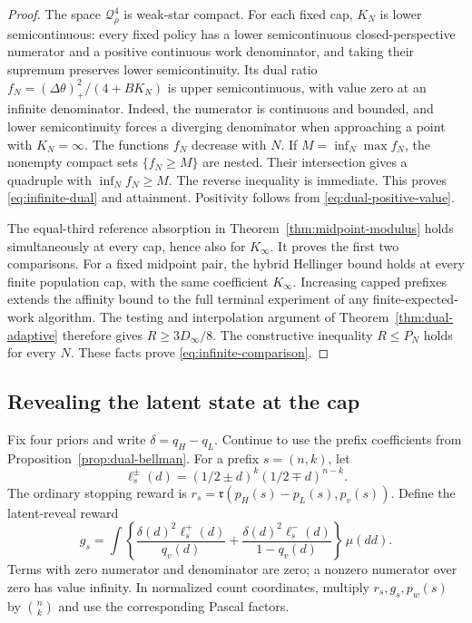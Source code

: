 \begin{proof}
The space $\mathcal Q_\rho^4$ is weak-star compact. For each fixed cap,
$K_N$ is lower semicontinuous: every fixed policy has a lower semicontinuous
closed-perspective numerator and a positive continuous work denominator,
and taking their supremum preserves lower semicontinuity. Its dual ratio
$f_N=(\Delta\theta)_+^2/(4+BK_N)$ is upper semicontinuous, with value zero
at an infinite denominator. Indeed, the numerator is continuous and
bounded, and lower semicontinuity forces a diverging denominator when
approaching a point with $K_N=\infty$. The functions $f_N$ decrease with $N$.
If $M=\inf_N\max f_N$, the nonempty compact sets $\{f_N\ge M\}$ are
nested. Their intersection gives a quadruple with $\inf_Nf_N\ge M$.
The reverse inequality is immediate. This proves \eqref{eq:infinite-dual}
and attainment. Positivity follows from \eqref{eq:dual-positive-value}.

The equal-third reference absorption in
Theorem~\ref{thm:midpoint-modulus} holds simultaneously at every cap,
hence also for $K_\infty$. It proves the first two comparisons.
For a fixed midpoint pair, the hybrid Hellinger bound holds at every
finite population cap, with the same coefficient $K_\infty$. Increasing
capped prefixes extends the affinity bound to the full terminal
experiment of any finite-expected-work algorithm. The testing and
interpolation argument of Theorem~\ref{thm:dual-adaptive} therefore gives
$R\ge3D_\infty/8$. The constructive inequality $R\le P_N$ holds for
every $N$. These facts prove \eqref{eq:infinite-comparison}.
\end{proof}

\subsection{Revealing the latent state at the cap}

Fix four priors and write $\delta=q_H-q_L$. Continue to use the prefix
coefficients from Proposition~\ref{prop:dual-bellman}. For a prefix
$s=(n,k)$, let
\[
 \ell_s^\pm(d)=(1/2\pm d)^k(1/2\mp d)^{n-k}.
\]
The ordinary stopping reward is
$r_s=\mathfrak r(p_H(s)-p_L(s),p_v(s))$. Define the latent-reveal reward
\begin{equation}\label{eq:genie-terminal}
 g_s=\int
 \left\{\frac{\delta(d)^2\ell_s^+(d)}{q_v(d)}+
             \frac{\delta(d)^2\ell_s^-(d)}{1-q_v(d)}\right\}\,\mu(dd).
\end{equation}
Terms with zero numerator and denominator are zero; a nonzero numerator
over zero has value infinity. In normalized count coordinates, multiply
$r_s,g_s,p_w(s)$ by $\binom nk$ and use the corresponding Pascal factors.

